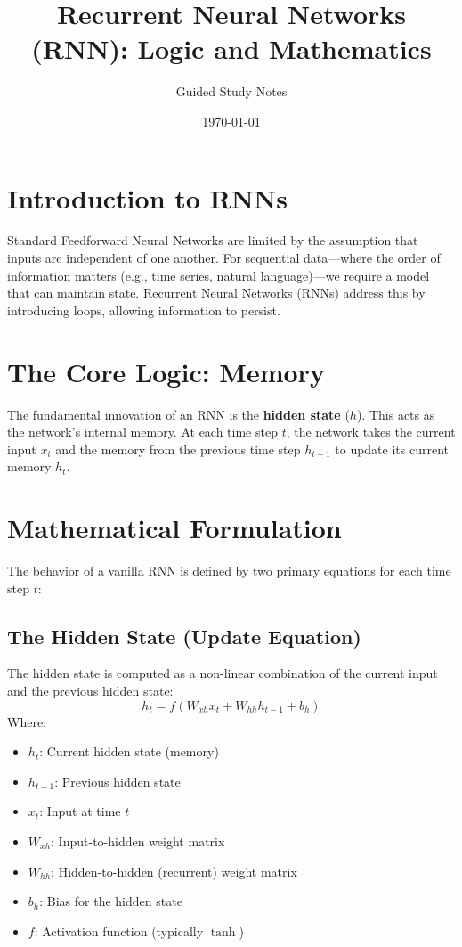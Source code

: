 \documentclass{article}
\title{Recurrent Neural Networks (RNN): Logic and Mathematics}
\author{Guided Study Notes}
\date{\today}
\begin{document}
\maketitle

\section{Introduction to RNNs}
Standard Feedforward Neural Networks are limited by the assumption that inputs are independent of one another. For sequential data—where the order of information matters (e.g., time series, natural language)—we require a model that can maintain state. Recurrent Neural Networks (RNNs) address this by introducing loops, allowing information to persist.

\section{The Core Logic: Memory}
The fundamental innovation of an RNN is the \textbf{hidden state} ($h$). This acts as the network's internal memory. At each time step $t$, the network takes the current input $x_t$ and the memory from the previous time step $h_{t-1}$ to update its current memory $h_t$.

\section{Mathematical Formulation}
The behavior of a vanilla RNN is defined by two primary equations for each time step $t$:

\subsection{The Hidden State (Update Equation)}
The hidden state is computed as a non-linear combination of the current input and the previous hidden state:
\begin{equation}
h_t = f(W_{xh} x_t + W_{hh} h_{t-1} + b_h)
\end{equation}
Where:
\begin{itemize}
    \item $h_t$: Current hidden state (memory)
    \item $h_{t-1}$: Previous hidden state
    \item $x_t$: Input at time $t$
    \item $W_{xh}$: Input-to-hidden weight matrix
    \item $W_{hh}$: Hidden-to-hidden (recurrent) weight matrix
    \item $b_h$: Bias for the hidden state
    \item $f$: Activation function (typically $\tanh$)
\end{itemize}
\end{document}
